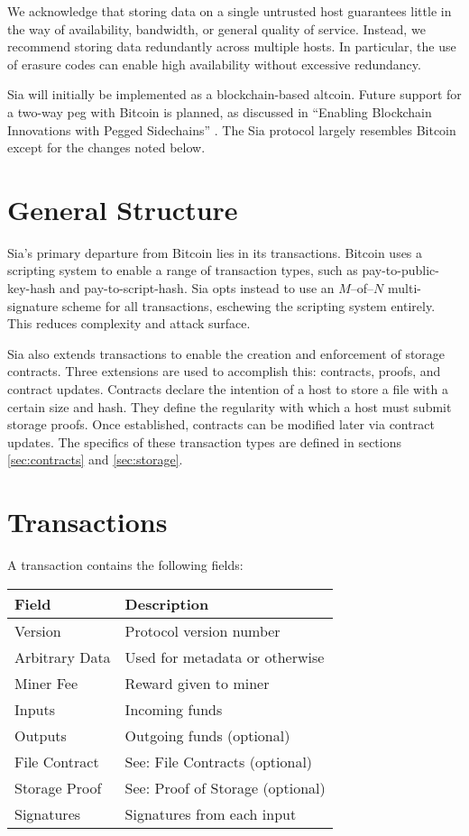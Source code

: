 \documentclass[twocolumn]{article}
\begin{document}
We acknowledge that storing data on a single untrusted host guarantees little in the way of availability, bandwidth, or general quality of service.
Instead, we recommend storing data redundantly across multiple hosts.
In particular, the use of erasure codes can enable high availability without excessive redundancy.

Sia will initially be implemented as a blockchain-based altcoin.
Future support for a two-way peg with Bitcoin is planned, as discussed in ``Enabling Blockchain Innovations with Pegged Sidechains'' \cite{side}.
The Sia protocol largely resembles Bitcoin except for the changes noted below.

\section{General Structure}
Sia's primary departure from Bitcoin lies in its transactions.
Bitcoin uses a scripting system to enable a range of transaction types, such as pay-to-public-key-hash and pay-to-script-hash.
Sia opts instead to use an $M$--of--$N$ multi-signature scheme for all transactions, eschewing the scripting system entirely.
This reduces complexity and attack surface.

Sia also extends transactions to enable the creation and enforcement of storage contracts.
Three extensions are used to accomplish this: contracts, proofs, and contract updates.
Contracts declare the intention of a host to store a file with a certain size and hash.
They define the regularity with which a host must submit storage proofs.
Once established, contracts can be modified later via contract updates.
The specifics of these transaction types are defined in sections \ref{sec:contracts} and \ref{sec:storage}.

\section{Transactions}
A transaction contains the following fields: \\

\noindent
\begin{tabular}{ l | l }
	\textbf{Field} & \textbf{Description} \\ \hline
	Version        & Protocol version number \\
	Arbitrary Data & Used for metadata or otherwise \\
	Miner Fee      & Reward given to miner \\
	Inputs         & Incoming funds \\
	Outputs        & Outgoing funds (optional) \\
	File Contract  & See: File Contracts (optional) \\
	Storage Proof  & See: Proof of Storage (optional) \\
	Signatures     & Signatures from each input \\
\end{tabular}
\end{document}
